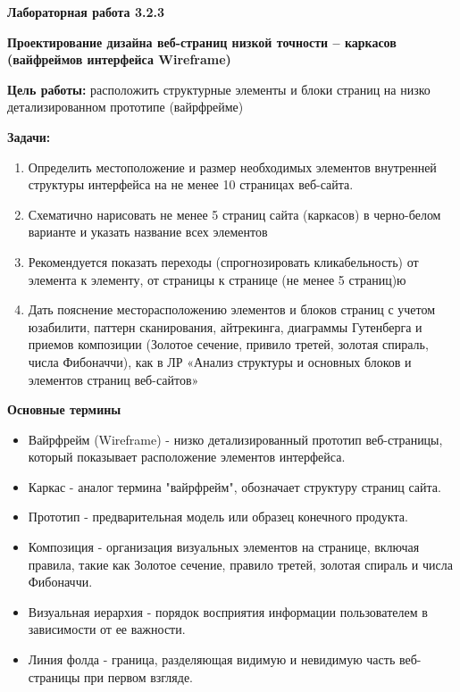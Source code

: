
\graphicspath{ {3.2.3/models/} }

\pagestyle{fancy}
\fancyhead{}
\renewcommand{\headrulewidth}{0pt}


\begin{center}
    \textbf{Лабораторная работа 3.2.3}

    \textbf{Проектирование дизайна веб-страниц низкой точности – каркасов (вайфреймов интерфейса Wireframe)}
\end{center}

\textbf{Цель работы:} расположить структурные элементы и блоки страниц на низко детализированном прототипе (вайрфрейме)
\bigskip

\textbf{Задачи:}

\begin{enumerate}
    \item Определить местоположение и размер необходимых элементов внутренней структуры интерфейса  на не менее 10 страницах веб-сайта.
    \item Схематично нарисовать  не менее 5 страниц сайта (каркасов) в черно-белом варианте и указать название всех элементов
    \item Рекомендуется показать переходы (спрогнозировать кликабельность) от элемента к элементу, от страницы к странице (не менее 5 страниц)ю
    \item Дать пояснение месторасположению элементов и блоков страниц с учетом юзабилити, паттерн сканирования, айтрекинга, диаграммы Гутенберга и приемов композиции (Золотое сечение, привило третей, золотая спираль, числа Фибоначчи), как в ЛР «Анализ структуры и основных блоков и элементов страниц веб-сайтов»
\end{enumerate}
\bigskip

\textbf{Основные термины}

\begin{itemize}
    \item Вайрфрейм (Wireframe) - низко детализированный прототип веб-страницы, который показывает расположение элементов интерфейса.
    \item Каркас - аналог термина "вайрфрейм", обозначает структуру страниц сайта.
    \item Прототип - предварительная модель или образец конечного продукта.
    \item Композиция - организация визуальных элементов на странице, включая правила, такие как Золотое сечение, правило третей, золотая спираль и числа Фибоначчи.
    \item Визуальная иерархия - порядок восприятия информации пользователем в зависимости от ее важности.
    \item Линия фолда - граница, разделяющая видимую и невидимую часть веб-страницы при первом взгляде.
\end{itemize}
\bigskip

